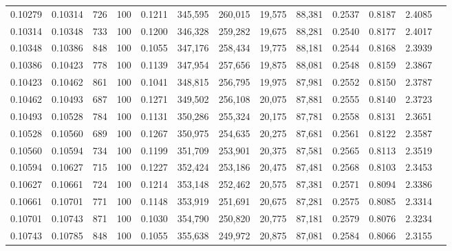 \begin{tabular}{rrrrrrrrrrrrr}
0.10279 & 0.10314 &   726 & 100 &                                     0.1211 & 345,595 & 260,015 &  19,575 &  88,381 & 0.2537 & 0.8187 & 2.4085 \\
0.10314 & 0.10348 &   733 & 100 &                                     0.1200 & 346,328 & 259,282 &  19,675 &  88,281 & 0.2540 & 0.8177 & 2.4017 \\
0.10348 & 0.10386 &   848 & 100 &                                     0.1055 & 347,176 & 258,434 &  19,775 &  88,181 & 0.2544 & 0.8168 & 2.3939 \\
0.10386 & 0.10423 &   778 & 100 &                                     0.1139 & 347,954 & 257,656 &  19,875 &  88,081 & 0.2548 & 0.8159 & 2.3867 \\
0.10423 & 0.10462 &   861 & 100 &                                     0.1041 & 348,815 & 256,795 &  19,975 &  87,981 & 0.2552 & 0.8150 & 2.3787 \\
0.10462 & 0.10493 &   687 & 100 &                                     0.1271 & 349,502 & 256,108 &  20,075 &  87,881 & 0.2555 & 0.8140 & 2.3723 \\
0.10493 & 0.10528 &   784 & 100 &                                     0.1131 & 350,286 & 255,324 &  20,175 &  87,781 & 0.2558 & 0.8131 & 2.3651 \\
0.10528 & 0.10560 &   689 & 100 &                                     0.1267 & 350,975 & 254,635 &  20,275 &  87,681 & 0.2561 & 0.8122 & 2.3587 \\
0.10560 & 0.10594 &   734 & 100 &                                     0.1199 & 351,709 & 253,901 &  20,375 &  87,581 & 0.2565 & 0.8113 & 2.3519 \\
0.10594 & 0.10627 &   715 & 100 &                                     0.1227 & 352,424 & 253,186 &  20,475 &  87,481 & 0.2568 & 0.8103 & 2.3453 \\
0.10627 & 0.10661 &   724 & 100 &                                     0.1214 & 353,148 & 252,462 &  20,575 &  87,381 & 0.2571 & 0.8094 & 2.3386 \\
0.10661 & 0.10701 &   771 & 100 &                                     0.1148 & 353,919 & 251,691 &  20,675 &  87,281 & 0.2575 & 0.8085 & 2.3314 \\
0.10701 & 0.10743 &   871 & 100 &                                     0.1030 & 354,790 & 250,820 &  20,775 &  87,181 & 0.2579 & 0.8076 & 2.3234 \\
0.10743 & 0.10785 &   848 & 100 &                                     0.1055 & 355,638 & 249,972 &  20,875 &  87,081 & 0.2584 & 0.8066 & 2.3155 \\

\end{tabular}
